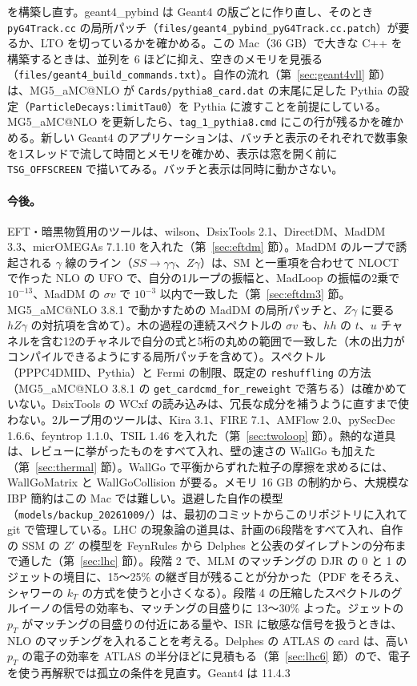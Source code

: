 \documentclass[a4paper,10pt]{ltjsarticle}
\makeatletter
\newcommand{\MGaMC}{MG5\_aMC@NLO}
\makeatother
\begin{document}
を構築し直す。geant4\_pybind は Geant4 の版ごとに作り直し、そのとき \texttt{pyG4Track.cc} の局所パッチ（\nolinkurl{files/geant4_pybind_pyG4Track.cc.patch}）が要るか、LTO を切っているかを確かめる。この Mac（36 GB）で大きな C++ を構築するときは、並列を 6 ほどに抑え、空きのメモリを見張る（\nolinkurl{files/geant4_build_commands.txt}）。自作の流れ（第~\ref{sec:geant4vll} 節）は、\MGaMC{} が \texttt{Cards/pythia8\_card.dat} の末尾に足した Pythia の設定（\texttt{ParticleDecays:limitTau0}）を Pythia に渡すことを前提にしている。\MGaMC{} を更新したら、\texttt{tag\_1\_pythia8.cmd} にこの行が残るかを確かめる。新しい Geant4 のアプリケーションは、バッチと表示のそれぞれで数事象を1スレッドで流して時間とメモリを確かめ、表示は窓を開く前に \texttt{TSG\_OFFSCREEN} で描いてみる。バッチと表示は同時に動かさない。

\paragraph{今後。}EFT・暗黒物質用のツールは、wilson、DsixTools 2.1、DirectDM、MadDM 3.3、micrOMEGAs 7.1.10 を入れた（第~\ref{sec:eftdm} 節）。MadDM のループで誘起される $\gamma$ 線のライン（$SS\to\gamma\gamma$、$Z\gamma$）は、SM と一重項を合わせて NLOCT で作った NLO の UFO で、自分の1ループの振幅と、MadLoop の振幅の2乗で $10^{-13}$、MadDM の $\sigma v$ で $10^{-3}$ 以内で一致した（第~\ref{sec:eftdm3} 節。\MGaMC{} 3.8.1 で動かすための MadDM の局所パッチと、$Z\gamma$ に要る $hZ\gamma$ の対抗項を含めて）。木の過程の連続スペクトルの $\sigma v$ も、$hh$ の $t$、$u$ チャネルを含む12のチャネルで自分の式と5桁の丸めの範囲で一致した（木の出力がコンパイルできるようにする局所パッチを含めて）。スペクトル（PPPC4DMID、Pythia）と Fermi の制限、既定の \texttt{reshuffling} の方法（\MGaMC{} 3.8.1 の \texttt{get\_cardcmd\_for\_reweight} で落ちる）は確かめていない。DsixTools の WCxf の読み込みは、冗長な成分を補うように直すまで使わない。2ループ用のツールは、Kira 3.1、FIRE 7.1、AMFlow 2.0、pySecDec 1.6.6、feyntrop 1.1.0、TSIL 1.46 を入れた（第~\ref{sec:twoloop} 節）。熱的な道具は、レビューに挙がったものをすべて入れ、壁の速さの WallGo も加えた（第~\ref{sec:thermal} 節）。WallGo で平衡からずれた粒子の摩擦を求めるには、WallGoMatrix と WallGoCollision が要る。メモリ 16 GB の制約から、大規模な IBP 簡約はこの Mac では難しい。退避した自作の模型（\nolinkurl{models/backup_20261009/}）は、最初のコミットからこのリポジトリに入れて git で管理している。LHC の現象論の道具は、計画の6段階をすべて入れ、自作の SSM の $Z'$ の模型を FeynRules から Delphes と公表のダイレプトンの分布まで通した（第~\ref{sec:lhc} 節）。段階 2 で、MLM のマッチングの DJR の 0 と 1 のジェットの境目に、15〜25\% の継ぎ目が残ることが分かった（PDF をそろえ、シャワーの $k_T$ の方式を使うと小さくなる）。段階 4 の圧縮したスペクトルのグルイーノの信号の効率も、マッチングの目盛りに 13〜30\% よった。ジェットの $p_T$ がマッチングの目盛りの付近にある量や、ISR に敏感な信号を扱うときは、NLO のマッチングを入れることを考える。Delphes の ATLAS の card は、高い $p_T$ の電子の効率を ATLAS の半分ほどに見積もる（第~\ref{sec:lhc6} 節）ので、電子を使う再解釈では孤立の条件を見直す。Geant4 は 11.4.3 
\end{document}
